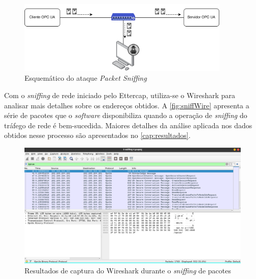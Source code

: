     \begin{figure}[htbp]
        \caption{\label{fig:sniffing}Esquemático do ataque \textit{Packet Sniffing}}
        \begin{center}
            \includegraphics[width=0.9\textwidth]{USPSC-img/sniffing.png}
        \end{center}
    \end{figure}
    
    Com o \textit{sniffing} de rede iniciado pelo Ettercap, utiliza-se o Wireshark para analisar mais detalhes sobre os endereços obtidos. A \autoref{fig:sniffWire} apresenta a série de pacotes que o \textit{software} disponibiliza quando a operação de \textit{sniffing} do tráfego de rede é bem-sucedida. Maiores detalhes da análise aplicada nos dados obtidos nesse processo são apresentados no \autoref{cap:resultados}.

    \begin{figure}[htbp]
        \caption{\label{fig:sniffWire}Resultados de captura do Wireshark durante o \textit{sniffing} de pacotes}
        \begin{center}
            \includegraphics[width=1\textwidth]{USPSC-img/sniffWire.png}
        \end{center}
    \end{figure}
    
